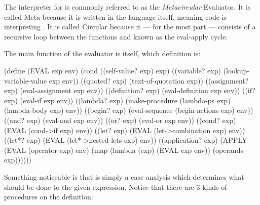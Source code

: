 
  The interpreter for  is commonly referred to as the \emph{Metacircular} Evaluator. It is called Meta because it is written in the language itself, meaning  code is interpreting . It is called Circular because it --- for the most part --- consists of a recursive loop between the functions  and  known as the eval-apply cycle.

  The main function of the evaluator is  itself, which definition is:

  \begin{code}
(define (EVAL exp env)
  (cond
    ((self-value? exp)  exp)
    ((variable? exp)    (lookup-variable-value exp env))
    ((quoted? exp)      (text-of-quotation exp))
    ((assignment? exp)  (eval-assignment exp env))
    ((definition? exp)  (eval-definition exp env))
    ((if? exp)          (eval-if exp env))
    ((lambda? exp)      (make-procedure (lambda-ps exp) (lambda-body exp) env))
    ((begin? exp)       (eval-sequence (begin-actions exp) env))
    ((and? exp)         (eval-and exp env))
    ((or? exp)          (eval-or exp env))
    ((cond? exp)        (EVAL (cond->if exp) env))
    ((let? exp)         (EVAL (let->combination exp) env))
    ((let*? exp)        (EVAL (let*->nested-lets exp) env))
    ((application? exp) (APPLY (EVAL (operator exp) env)
                               (map (lambda (exp) (EVAL exp env))
                                    (operands exp))))))
  \end{code}

  Something noticeable is that  is simply a case analysis which determines what should be done to the given expression. Notice that there are 3 kinds of procedures on the  definition:

